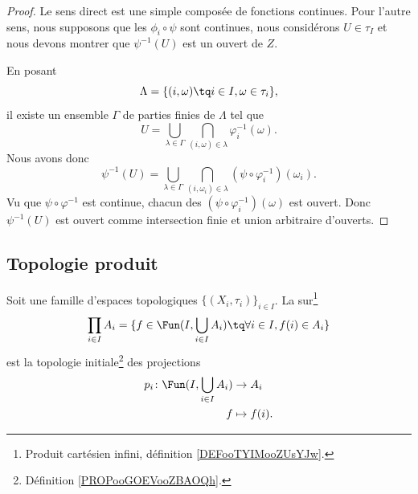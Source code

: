 \begin{proof}
	Le sens direct est une simple composée de fonctions continues. Pour l'autre sens, nous supposons que les \( \phi_i\circ\psi\) sont continues, nous considérons \( U\in \tau_I\) et nous devons montrer que \( \psi^{-1}(U)\) est un ouvert de \( Z\).

	En posant
	\begin{equation}
		\Lambda=\{ (i,\omega)\tq i\in I,\omega\in \tau_i \},
	\end{equation}
	il existe un ensemble \( \Gamma\) de parties finies de \( \Lambda\) tel que
	\begin{equation}
		U= \bigcup_{\lambda\in \Gamma}  \bigcap_{(i,\omega)\in\lambda}\varphi_i^{-1}(\omega).
	\end{equation}
	Nous avons donc
	\begin{equation}
		\psi^{-1}(U)=\bigcup_{\lambda\in \Gamma}\bigcap_{(i,\omega_i)\in\lambda}(\psi\circ\varphi_i^{-1})(\omega_i).
	\end{equation}
	Vu que \( \psi\circ\varphi^{-1}\) est continue, chacun des \( (\psi\circ\varphi_i^{-1})(\omega)\) est ouvert. Donc \( \psi^{-1}(U)\) est ouvert comme intersection finie et union arbitraire d'ouverts.
\end{proof}



\subsection{Topologie produit}


\begin{definition}	\label{DEFooJHXKooQApPtQ}
	Soit une famille d'espaces topologiques \( \{ (X_i,\tau_i) \}_{i\in I}\). La  sur\footnote{Produit cartésien infini, définition \ref{DEFooTYIMooZUsYJw}.}
	\begin{equation}
		\prod_{i\in I}A_i=\{ f\in\Fun(I,\bigcup_{i\in I}A_i)\tq \forall i\in I, f(i)\in A_i \}
	\end{equation}
	est la topologie initiale\footnote{Définition \ref{PROPooGOEVooZBAOQh}.} des projections
	\begin{equation}
		\begin{aligned}
			p_i\colon \Fun(I,\bigcup_{i\in I}A_i) & \to A_i          \\
			f                                     & \mapsto f(i)   .
		\end{aligned}
	\end{equation}
\end{definition}


